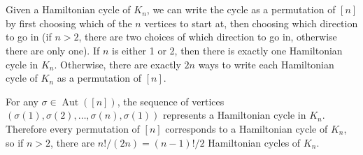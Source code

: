 \documentclass[12pt]{article}
\begin{document}
\section{}
\noindent{}\bigskip\par
Given a Hamiltonian cycle of $K_n$, we can write the cycle as a permutation of $[n]$ by first choosing which of the $n$ vertices to start at, then choosing which direction to go in (if $n > 2$, there are two choices of which direction to go in, otherwise there are only one). If $n$ is either 1 or 2, then there is exactly one Hamiltonian cycle in $K_n$. Otherwise, there are exactly $2n$ ways to write each Hamiltonian cycle of $K_n$ as a permutation of $[n]$.
\par
For any $\sigma \in \operatorname{Aut}([n])$, the sequence of vertices $(\sigma(1), \sigma(2), \dots, \sigma(n), \sigma(1))$ represents a Hamiltonian cycle in $K_n$. Therefore every permutation of $[n]$ corresponds to a Hamiltonian cycle of $K_n$, so if $n > 2$, there are $n!/(2n)=(n-1)!/2$ Hamiltonian cycles of $K_n$.

\section{}
\noindent{}\bigskip\par
\end{document}

